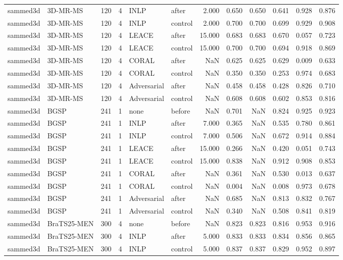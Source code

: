 \begin{tabular}{llrrllrrrrrr}
sammed3d & 3D-MR-MS & 120 & 4 & INLP & after & 2.000 & 0.650 & 0.650 & 0.641 & 0.928 & 0.876 \\
sammed3d & 3D-MR-MS & 120 & 4 & INLP & control & 2.000 & 0.700 & 0.700 & 0.699 & 0.929 & 0.908 \\
sammed3d & 3D-MR-MS & 120 & 4 & LEACE & after & 15.000 & 0.683 & 0.683 & 0.670 & 0.057 & 0.723 \\
sammed3d & 3D-MR-MS & 120 & 4 & LEACE & control & 15.000 & 0.700 & 0.700 & 0.694 & 0.918 & 0.869 \\
sammed3d & 3D-MR-MS & 120 & 4 & CORAL & after & NaN & 0.625 & 0.625 & 0.629 & 0.009 & 0.633 \\
sammed3d & 3D-MR-MS & 120 & 4 & CORAL & control & NaN & 0.350 & 0.350 & 0.253 & 0.974 & 0.683 \\
sammed3d & 3D-MR-MS & 120 & 4 & Adversarial & after & NaN & 0.458 & 0.458 & 0.428 & 0.826 & 0.710 \\
sammed3d & 3D-MR-MS & 120 & 4 & Adversarial & control & NaN & 0.608 & 0.608 & 0.602 & 0.853 & 0.816 \\
sammed3d & BGSP & 241 & 1 & none & before & NaN & 0.701 & NaN & 0.824 & 0.925 & 0.923 \\
sammed3d & BGSP & 241 & 1 & INLP & after & 7.000 & 0.365 & NaN & 0.535 & 0.780 & 0.861 \\
sammed3d & BGSP & 241 & 1 & INLP & control & 7.000 & 0.506 & NaN & 0.672 & 0.914 & 0.884 \\
sammed3d & BGSP & 241 & 1 & LEACE & after & 15.000 & 0.266 & NaN & 0.420 & 0.051 & 0.743 \\
sammed3d & BGSP & 241 & 1 & LEACE & control & 15.000 & 0.838 & NaN & 0.912 & 0.908 & 0.853 \\
sammed3d & BGSP & 241 & 1 & CORAL & after & NaN & 0.361 & NaN & 0.530 & 0.013 & 0.637 \\
sammed3d & BGSP & 241 & 1 & CORAL & control & NaN & 0.004 & NaN & 0.008 & 0.973 & 0.678 \\
sammed3d & BGSP & 241 & 1 & Adversarial & after & NaN & 0.685 & NaN & 0.813 & 0.832 & 0.767 \\
sammed3d & BGSP & 241 & 1 & Adversarial & control & NaN & 0.340 & NaN & 0.508 & 0.841 & 0.819 \\
sammed3d & BraTS25-MEN & 300 & 4 & none & before & NaN & 0.823 & 0.823 & 0.816 & 0.953 & 0.916 \\
sammed3d & BraTS25-MEN & 300 & 4 & INLP & after & 5.000 & 0.833 & 0.833 & 0.834 & 0.856 & 0.865 \\
sammed3d & BraTS25-MEN & 300 & 4 & INLP & control & 5.000 & 0.837 & 0.837 & 0.829 & 0.952 & 0.897 \\

\end{tabular}

